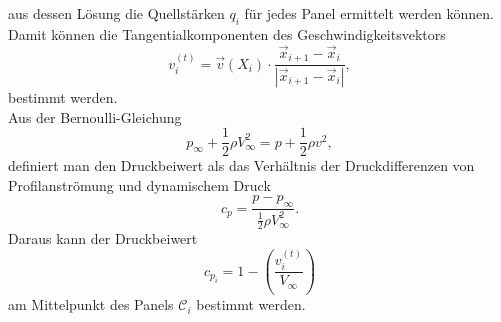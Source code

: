aus dessen Lösung die Quellstärken $q_i$ für jedes Panel ermittelt werden können. \\
Damit können die Tangentialkomponenten des Geschwindigkeitsvektors
\begin{equation}
\label{eqn:vt}
v_i^{(t)} =  \vec v(X_i) \cdot \frac{\vec x_{i+1}-\vec x_i}{|\vec x_{i+1}-\vec x_i|},
\end{equation}
bestimmt werden. \\
Aus der Bernoulli-Gleichung
\begin{equation}
p_{\infty} + \frac{1}{2} \rho V_{\infty}^2 =  p + \frac{1}{2} \rho v^2,
\end{equation}
definiert man den Druckbeiwert als das Verhältnis der Druckdifferenzen von Profilanströmung und dynamischem Druck 
\begin{equation}
c_p =  \frac{p-p_{\infty}}{\frac{1}{2} \rho V_{\infty}^2}.
\end{equation}
Daraus kann der Druckbeiwert
\begin{equation}
c_{p_i} =  1 - \left( \frac{v_i^{(t)}}{V_{\infty}}\right)
\end{equation}
am Mittelpunkt des Panels $\mathcal{C}_i$ bestimmt werden. \cite{Hess:1966} \cite{Cebeci:1999} 
